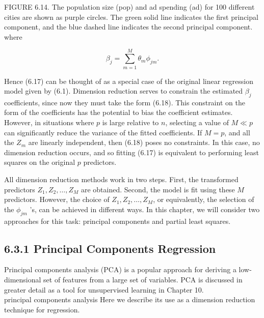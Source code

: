 \documentclass[10pt]{article}
\begin{document}
FIGURE 6.14. The population size (pop) and ad spending (ad) for 100 different cities are shown as purple circles. The green solid line indicates the first principal component, and the blue dashed line indicates the second principal component.\\
where


\begin{equation*}
\beta_{j}=\sum_{m=1}^{M} \theta_{m} \phi_{j m} . \tag{6.18}
\end{equation*}


Hence (6.17) can be thought of as a special case of the original linear regression model given by (6.1). Dimension reduction serves to constrain the estimated $\beta_{j}$ coefficients, since now they must take the form (6.18). This constraint on the form of the coefficients has the potential to bias the coefficient estimates. However, in situations where $p$ is large relative to $n$, selecting a value of $M \ll p$ can significantly reduce the variance of the fitted coefficients. If $M=p$, and all the $Z_{m}$ are linearly independent, then (6.18) poses no constraints. In this case, no dimension reduction occurs, and so fitting (6.17) is equivalent to performing least squares on the original $p$ predictors.

All dimension reduction methods work in two steps. First, the transformed predictors $Z_{1}, Z_{2}, \ldots, Z_{M}$ are obtained. Second, the model is fit using these $M$ predictors. However, the choice of $Z_{1}, Z_{2}, \ldots, Z_{M}$, or equivalently, the selection of the $\phi_{j m}$ 's, can be achieved in different ways. In this chapter, we will consider two approaches for this task: principal components and partial least squares.

\subsection*{6.3.1 Principal Components Regression}
Principal components analysis (PCA) is a popular approach for deriving a low-dimensional set of features from a large set of variables. PCA is discussed in greater detail as a tool for unsupervised learning in Chapter 10.\\
principal components analysis Here we describe its use as a dimension reduction technique for regression.
\end{document}
